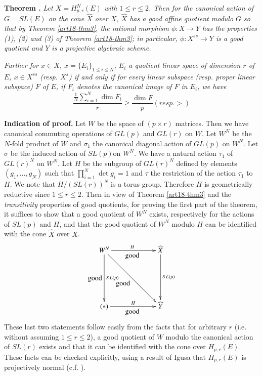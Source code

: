 \medskip
\noindent
{\bf Theorem .\label{art18-thm4}}
{\em Let $X=H^{N}_{p,r}(E)$ with $1\leq r\leq 2$. Then for the canonical action of $G=SL(E)$ on the cone $\widehat{X}$ over $X$, $\widehat{X}$ has a good affine quotient modulo $G$ so that by Theorem \ref{art18-thm3}, the rational morphism $\phi:X\to Y$ has the properties {\rm(1), (2)} and {\rm(3)} of Theorem \ref{art18-thm3}; in particular, $\phi:X^{ss}\to Y$ is a good quotient and $Y$ is a projective algebraic scheme.}

{\em Further for $x\in X$, $x=\{E_{i}\}_{1\leq i\leq N}$, $E_{i}$ a quotient linear space of dimension $r$ of $E$, $x\in X^{ss}$ (resp. $X^{s}$) if and only if for every linear subspace (resp. proper linear subspace) $F$ of $E$, if $F_{i}$ denotes the canonical image of $F$ in $E_{i}$, we have}
$$
\frac{\frac{1}{N}\sum\limits^{N}_{i=1}\dim F_{i}}{r}\geq \frac{\dim F}{p}(resp. >)
$$

\smallskip
\noindent
{\bf Indication of proof.} Let $W$ be the space of $(p\times r)$ matrices. Then we have canonical commuting operations of $GL(p)$ and $GL(r)$ on $W$. Let $W^{N}$ be the $N$-fold product of $W$ and $\sigma_{1}$ the canonical diagonal action of $GL(p)$ on $W^{N}$. Let $\sigma$ be the induced action of $SL(p)$\pageoriginale on $W^{N}$. We have a natural action $\tau_{1}$ of $GL(r)^{N}$ on $W^{N}$. Let $H$ be the subgroup of $GL(r)^{N}$ defined by elements $(g_{1},\ldots,g_{N})$ such that $\prod\limits^{N}_{i=1}\det g_{i}=1$ and $\tau$ the restriction of the action $\tau_{1}$ to $H$. We note that $H/(SL(r))^{N}$ is a torus group. Therefore $H$ is geometrically reductive since $1\leq r\leq 2$. Then in view of Theorem \ref{art18-thm3} and the {\em transitivity} properties of good quotients, for proving the first part of the theorem, it suffices to show that a good quotient of $W^{N}$ exists, respectively for the actions of $SL(p)$ and $H$, and that the good quotient of $W^{N}$ modulo $H$ can be identified with the cone $\widehat{X}$ over $X$.
\[
\xymatrix@=2.2cm{
W^{N}\ar[d]_{\displaystyle\text{good}}^-{SL(p)} \ar[r]^{H}_{\displaystyle\text{good}}\ar[dr]_-{\displaystyle\text{good}} & \widehat{X}\ar[d]^-{SL(p)}\\
(*)\ar[r]^-{H}_{\displaystyle\text{good}} & \widehat{Y}
}
\]
These last two statements follow easily from the facts that for arbitrary $r$ (i.e. without assuming $1\leq r\leq 2$), a good quotient of $W$ modulo the canonical action of $SL(r)$ exists and that it can be identified with the cone over $H_{p,r}(E)$. These facts can be checked explicitly, using a result of Igusa that $H_{p,r}(E)$ is projectively normal (c.f. \cite{art18-key4}).

